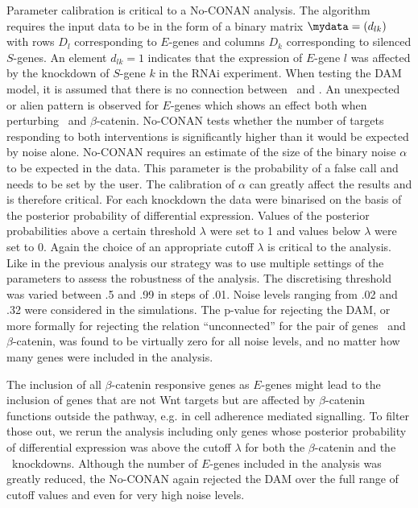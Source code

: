 Parameter calibration is critical to a No-CONAN analysis. The algorithm requires the input data to be in the form of a binary matrix $\mydata=(d_{lk})$ with rows $D_l$ corresponding to $E$-genes and 
columns $D_k$ corresponding to silenced $S$-genes. 
An element $d_{lk}=1$ indicates that the expression of $E$-gene $l$ was affected by the knockdown of $S$-gene $k$ in the RNAi experiment. 
When testing the DAM model, 
it is assumed that there is no connection between \eviG~and \betaCatG. An unexpected or alien pattern is observed for $E$-genes which shows an effect both when perturbing \eviG~and $\beta$-catenin. No-CONAN tests whether the number of targets responding to both interventions is significantly higher than it would be expected by noise alone. No-CONAN requires an estimate of the size of the binary noise $\alpha$ to be expected in the data. This parameter is the probability of a false call and needs to be set by the user. The calibration of $\alpha$ can greatly affect the results and is therefore critical.
For each knockdown the data were binarised on the basis of the posterior probability of differential expression. Values of the posterior probabilities above a certain threshold $\lambda$ were set to 1 and values below $\lambda$ were set to 0. Again the choice of an appropriate cutoff $\lambda$ is critical to the analysis. Like in the previous analysis our strategy was to use multiple settings of the parameters to assess the robustness of the analysis. The discretising threshold was varied between .5 and .99 in steps of .01. Noise levels ranging from .02 and .32 were considered in the simulations. The p-value for rejecting the DAM, or more formally for rejecting the relation ``unconnected'' for the pair of genes \eviG~and $\beta$-catenin, was found to be virtually zero for all noise levels, and no matter how many genes were included in the analysis.

The inclusion of all $\beta$-catenin responsive genes as $E$-genes might lead to the inclusion of genes that are not 
Wnt targets but are affected by $\beta$-catenin functions outside the pathway, 
e.g. in cell adherence mediated signalling. To filter those out, we rerun the analysis including only genes whose posterior probability of differential expression was above the cutoff $\lambda$ for both the $\beta$-catenin and the \tcfG~knockdowns. Although the number of $E$-genes included in the analysis was greatly reduced, the No-CONAN again rejected the DAM over the full range of cutoff values and even for very high noise levels.

